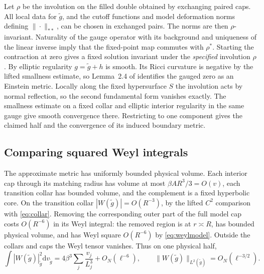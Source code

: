 \documentclass[11pt]{article}
\theoremstyle{remark}
\newcommand{\dd}{\mathrm d}
\begin{document}
Let \(\rho\) be the involution on the filled double obtained by exchanging paired caps. All local data for \(\widetilde g\), and the cutoff functions and model deformation norms defining \(\|\cdot\|_{**}\), can be chosen in exchanged pairs. The norms are then \(\rho\)-invariant. Naturality of the gauge operator with its background and uniqueness of the linear inverse imply that the fixed-point map commutes with \(\rho^*\). Starting the contraction at zero gives a fixed solution invariant under the \emph{specified} involution \(\rho\). By elliptic regularity \(g=\widetilde g+h\) is smooth. Its Ricci curvature is negative by the lifted smallness estimate, so Lemma~2.4 of \cite{bamler} identifies the gauged zero as an Einstein metric. Locally along the fixed hypersurface \(S\) the involution acts by normal reflection, so the second fundamental form vanishes exactly. The smallness estimate on a fixed collar and elliptic interior regularity in the same gauge give smooth convergence there. Restricting to one component gives the claimed half and the convergence of its induced boundary metric.

\subsection{Comparing squared Weyl integrals}

The approximate metric has uniformly bounded physical volume. Each interior cap through its matching radius has volume at most \(\beta A R^3/3=O(v)\), each transition collar has bounded volume, and the complement is a fixed hyperbolic core. On the transition collar \(|W(\widetilde g)|=O(R^{-3})\), by the lifted \(C^2\) comparison with \eqref{eq:collar}. Removing the corresponding outer part of the full model cap costs \(O(R^{-6})\) in its Weyl integral: the removed region is at \(r\asymp R\), has bounded physical volume, and has Weyl square \(O(R^{-6})\) by \eqref{eq:weylmodel}. Outside the collars and caps the Weyl tensor vanishes. Thus on one physical half,
\begin{equation}\label{eq:approx}
 \int |W(\widetilde g)|_{\widetilde g}^2\dd v_{\widetilde g}
   =4\beta^3\sum_j \frac{v_j}{L_j^3}+O_N(\ell^{-6}),
 \qquad
 \|W(\widetilde g)\|_{L^2(\widetilde g)}=O_N(\ell^{-3/2}).
\end{equation}
\end{document}
